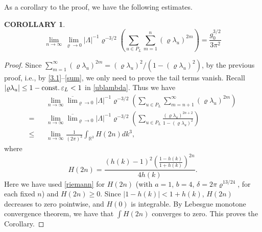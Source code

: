 \documentclass[11pt]{article}
\numberwithin{equation}{section}
\newcommand{\e}{\varepsilon}
\newcommand{\beq}{\begin{equation}}
\newcommand{\eeq}{\end{equation}}
\newcommand{\beqa}{\begin{eqnarray}}
\newcommand{\eeqa}{\end{eqnarray}}
\newcommand\R{{\mathbb R}}
\newcommand\const{{\rm const.\, }}
\renewcommand\rho\varrho
\newtheorem{cor}{COROLLARY}[section]
\theoremstyle{definition}
\begin{document}
As a corollary to the proof,  we have the following estimates.
\begin{cor}\label{cortail}
\beq\label{tail}
\lim_{ n \to \infty}\lim_{\rho\to 0}|\Lambda|^{-1}\rho^{-3/2}\left(\sum_{u\in P_L}\sum_{m=1}^{n}\left(\rho\lambda_u\right)^{2m}\right)
= \frac{g_0^{3/2}}{3\pi^2}
\eeq
\end{cor}
\begin{proof}
Since $\sum_{m=1}^\infty(\rho\lambda_u)^{2m}=(\rho\lambda_u)^2/(1-(\rho\lambda_u)^2)$, by the previous proof, i.e., by \eqref{3.1}--\eqref{sum}, we only need to prove  the tail terms vanish.
Recall $\left|\rho \lambda_u \right|\le 1 - \const \e_L < 1$ in \eqref{ublambda}. Thus we have
\beqa\label{temp6.35}
&&\lim_{n\to \infty}\overline\lim_{\rho\to 0}|\Lambda|^{-1}\rho^{-3/2}\left(\sum_{u\in P_L}\sum_{m=n+1}^{\infty}\left(\rho\lambda_u\right)^{2m}\right)
\\\nonumber
= &&\lim_{n\to \infty}\overline\lim_{\rho\to 0}|\Lambda|^{-1}\rho^{-3/2}    \left(\sum_{u\in P_L}  \frac{(\rho\lambda_u)^{2n+2}}{1-(\rho\lambda_u)^2}\right) \\\nonumber
\le &&\lim_{n\to \infty}\frac{1}{(2\pi)^3}
\int_{\R^3}
H(2n)dk^3  ,
\eeqa
where
$$
H(2n)=\frac{(h(k)-1)^2\left(\frac{1-h(k)}{1+h(k)}\right)^{2n}}{4h(k)}.
$$
Here we have used \eqref{riemann} for $H(2n)$ (with $a=1$, $b=4$, $\delta=2\pi\rho^{13/24}$, for each fixed $n$) and $H(2n)\geq0$.
Since $|1-h(k)|<1+h(k)$, $H(2n)$ decreases to zero pointwise, and $H(0)$ is integrable. By Lebesgue monotone convergence theorem, we have that  $\int H(2n)$ converges to zero. This proves the
Corollary.
\end{proof}

\bigskip 
\end{document}
